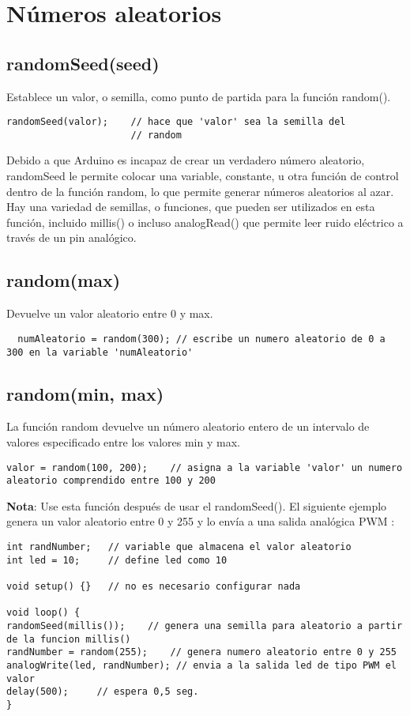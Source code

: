 \chapter{Números aleatorios}
\section{randomSeed(seed)}

Establece un valor, o semilla, como punto de partida para la función random().
\begin{lstlisting}
randomSeed(valor);    // hace que 'valor' sea la semilla del
                      // random
\end{lstlisting}
Debido a que Arduino es incapaz de crear un verdadero número aleatorio, randomSeed le permite colocar una variable, constante, u otra función de control dentro de la función random, lo que permite generar números aleatorios al azar. Hay una variedad de semillas, o funciones, que pueden ser utilizados en esta función, incluido millis() o incluso analogRead() que permite leer ruido eléctrico a través de un pin analógico.
\section{random(max)}

Devuelve un valor aleatorio entre 0 y max.
\begin{lstlisting}
  numAleatorio = random(300); // escribe un numero aleatorio de 0 a 300 en la variable 'numAleatorio'
\end{lstlisting}

\section{random(min, max)}

La función random devuelve un número aleatorio entero de un intervalo de valores especificado entre los valores min y max.
\begin{lstlisting}
valor = random(100, 200);    // asigna a la variable 'valor' un numero aleatorio comprendido entre 100 y 200
\end{lstlisting}
\textbf{Nota}: Use esta función después de usar el randomSeed().
El siguiente ejemplo genera un valor aleatorio entre 0 y 255 y lo envía a una salida analógica PWM :
\begin{lstlisting}              
int randNumber;   // variable que almacena el valor aleatorio
int led = 10;     // define led como 10

void setup() {}   // no es necesario configurar nada

void loop() {
randomSeed(millis());    // genera una semilla para aleatorio a partir de la funcion millis()
randNumber = random(255);    // genera numero aleatorio entre 0 y 255 
analogWrite(led, randNumber); // envia a la salida led de tipo PWM el valor 
delay(500);     // espera 0,5 seg.
}
\end{lstlisting}